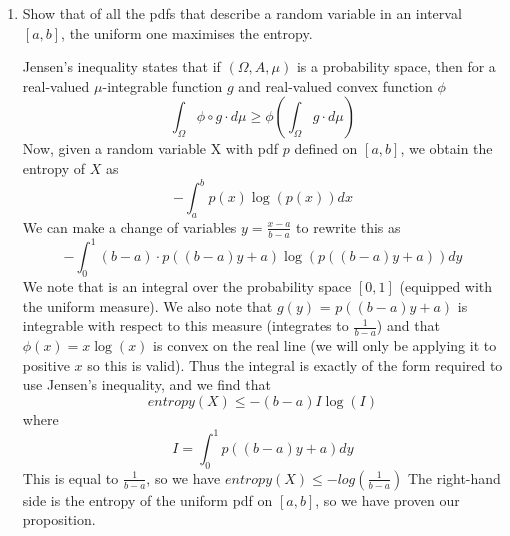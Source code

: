 \documentclass{article}
\newcommand{\chapternumber}{2}
\newenvironment{QandA}{\begin{enumerate}[label=\chapternumber.\arabic*]\bfseries\boldmath}
	{\end{enumerate}}
\newenvironment{answered}{\par\bigskip\normalfont\unboldmath}{}
\begin{document}
\begin{QandA}
\begin{answered}
	\end{answered}

	\item Show that of all the pdfs that describe a random variable in an interval $[a,b]$, the uniform one maximises the entropy.
	\begin{answered}
		Jensen's inequality states that if $(\Omega,A,\mu)$ is a probability space, then for a real-valued $\mu$-integrable function $g$ and real-valued convex function $\phi$
		\[\int_\Omega\phi\circ g\cdot d\mu\geq\phi\left(\int_\Omega g\cdot d\mu\right)\]
		Now, given a random variable X with pdf $p$ defined on $[a,b]$, we obtain the entropy of $X$ as
		\[-\int_a^bp(x)\log(p(x))dx\]
		We can make a change of variables $y=\frac{x-a}{b-a}$ to rewrite this as
		\[-\int_0^1(b-a)\cdot p((b-a)y+a)\log(p((b-a)y+a))dy\]
		We note that is an integral over the probability space $[0,1]$ (equipped with the uniform measure). We also note that $g(y)$ = $p((b-a)y+a)$ is integrable with respect to this measure (integrates to $\frac{1}{b-a}$) and that $\phi(x)=x\log(x)$ is convex on the real line (we will only be applying it to positive $x$ so this is valid). Thus the integral is exactly of the form required to use Jensen's inequality, and we find that
		\[entropy(X)\leq-(b-a)I\log(I)\]
		where
		\[I=\int_0^1p((b-a)y+a)dy\]
		This is equal to $\frac{1}{b-a}$, so we have
		$entropy(X)\leq -log(\frac{1}{b-a})$
		The right-hand side is the entropy of the uniform pdf on $[a,b]$, so we have proven our proposition.
	\end{answered}
	
	\end{QandA}
\end{document}
